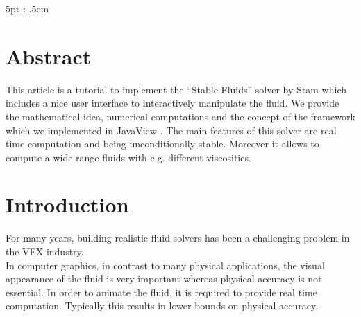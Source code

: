 \documentclass[a4paper,10pt,oneside,final,german,openbib,pdftex,titlepage]{scrbook}
\begin{document}
\mainmatter
\sloppy

    {\topsep}             %
    {5pt}             %
    {\itshape}         %
    {\parindent}       %
    {\bfseries}        %
    {:}                %
    {.5em}             %
    {}                 %

\theoremstyle{test333}
\newtheorem{test333}{TEST}
\newtheorem{thm}{Theorem}


\theoremstyle{theorem}%
\newtheorem{Lem}[thm]{Lemma}
\newtheorem{Cor}[thm]{Corollary}
\newtheorem{Def}[thm]{Definition}

\theoremstyle{definition}
\newtheorem{Rem}[thm]{Remark}
\newtheorem{State}[subsection]{\#}



\makeatletter
\g@addto@macro{\thm@space@setup}{\thm@headpunct{:}}
\makeatother

\setcounter{chapter}{-1}
\chapter{Abstract}
This article is a tutorial to implement the ``Stable Fluids'' solver by Stam \cite{Stam} which includes a nice user interface to interactively manipulate the fluid. We provide the mathematical idea, numerical computations and the concept of the framework which we implemented in JavaView \cite{JavaView}. The main features of this solver are real time computation and being unconditionally stable. Moreover it allows to compute a wide range fluids with e.g. different viscosities.
\chapter{Introduction}

For many years, building realistic fluid solvers has been a challenging problem in the VFX industry.\\
In computer graphics, in contrast to many physical applications, the visual appearance of the fluid is very important whereas physical accuracy is not essential. In order to animate the fluid, it is required to provide real time computation. Typically this results in lower bounds on physical accuracy.\\
\end{document}
